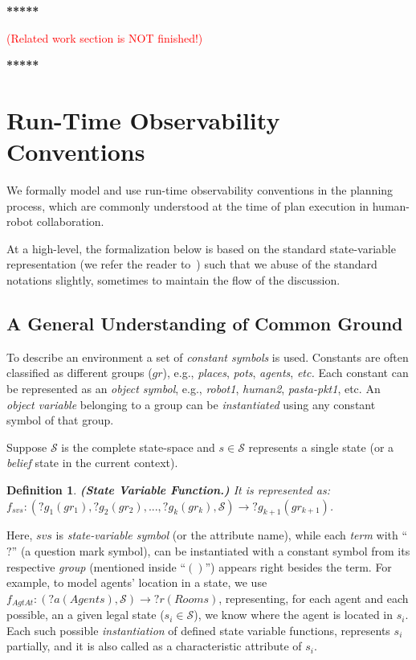 \documentclass[letterpaper]{article} %
\newtheorem{definition}{Definition}
\begin{document}
\textbf{*****}

\textcolor{red}{(Related work section is NOT finished!)}

\textbf{*****}

\section{Run-Time Observability Conventions}
We formally model and use run-time observability conventions in the planning process, which are commonly understood at the time of plan execution in human-robot collaboration. 

At a high-level, the formalization below is based on the standard state-variable representation (we refer the reader to~\cite{naubooks0014222}) such that we abuse of the standard notations slightly, sometimes to maintain the flow of the discussion.

\subsection{A General Understanding of Common Ground}
To describe an environment a set of \textit{constant symbols} is used. 
Constants are often classified as different groups ($gr$), e.g., \textit{places}, \textit{pots}, \textit{agents}, \textit{etc.} 
Each constant can be represented as an \textit{object symbol}, e.g., \textit{robot1}, \textit{human2}, \textit{pasta-pkt1}, etc. 
An \textit{object variable} belonging to a group can be \textit{instantiated} using any constant symbol of that group.

Suppose $\mathcal{S}$ is the complete state-space and $s \in \mathcal{S}$ represents a single state (or a \textit{belief} state in the current context).  


\begin{definition}
\textbf{(State Variable Function.)} It is represented as: $f_{svs}:(?g_1 (gr_1), ?g_2 (gr_2), ..., ?g_k (gr_k),\mathcal{S})\rightarrow ?g_{k+1} (gr_{k+1})$. 
\end{definition}
Here, $svs$ is \textit{state-variable symbol} (or the attribute name), while each \textit{term} with ``$?$'' (a question mark symbol), can be instantiated with a constant symbol from its respective \textit{group} (mentioned inside ``$()$'') appears right besides the term. 
For example, to model agents' location in a state, we use $f_{\textit{AgtAt}}:(?a (Agents), \mathcal{S}) \rightarrow ?r (Rooms)$, representing, for each agent and each possible, an a given legal state ($s_i \in \mathcal{S}$), we know where the agent is located in $s_i$. 
Each such possible \textit{instantiation} of defined state variable functions, represents $s_i$ partially, and it is also called as a characteristic attribute of $s_i$.     
\end{document}
